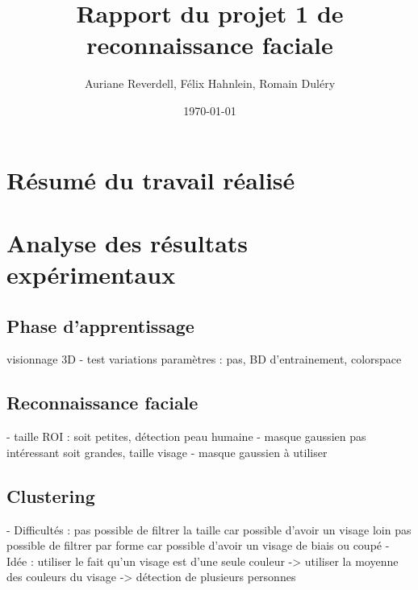 \documentclass[a4paper,11pt]{article}
\title{Rapport du projet 1 de reconnaissance faciale}
\author{Auriane Reverdell, Félix Hahnlein, Romain Duléry}
\date{\today}
\begin{document}
\maketitle
\vspace{1cm}

\section{Résumé du travail réalisé}
\section{Analyse des résultats expérimentaux}
\subsection{Phase d'apprentissage}
visionnage 3D
- test variations paramètres : pas, BD d'entrainement, colorspace
\subsection{Reconnaissance faciale}
- taille ROI :
      soit petites, détection peau humaine
          - masque gaussien pas intéressant
      soit grandes, taille visage
          - masque gaussien à utiliser
\subsection{Clustering}
- Difficultés : pas possible de filtrer la taille car possible d'avoir un visage loin
                pas possible de filtrer par forme car possible d'avoir un visage de biais ou coupé
- Idée : utiliser le fait qu'un visage est d'une seule couleur
-> utiliser la moyenne des couleurs du visage
-> détection de plusieurs personnes
\end{document}
